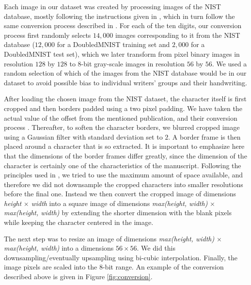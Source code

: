 \documentclass[eng]{simposium}
\begin{document}
Each image in our dataset was created by processing images of the NIST database,  
mostly following the instructions given in \cite{1}, which in turn follow the same conversion process described in \cite{8}.  
For each of the ten digits, our conversion process first randomly selects $14,000$ images corresponding to it from the NIST  
database ($12,000$ for a DoubledMNIST training set and $2,000$ for a DoubledMNIST test set), which we later transform  
from pixel binary images in resolution $128$ by $128$ to 8-bit gray-scale images in resolution $56$ by $56$.  
We used a random selection of which of the images from the NIST database would be in our dataset to avoid possible  
bias to individual writers' groups and their handwriting.  

After loading the chosen image from the NIST dataset, the character itself is first cropped and then borders padded using a two pixel padding.  
We have taken the actual value of the offset from the mentioned publication, and their conversion process \cite{1}.  
Thereafter, to soften the character borders, we blurred cropped image using a Gaussian filter with standard deviation set to $2$.  
A border frame is then placed around a character that is so extracted.  
It is important to emphasize here that the dimensions of the border frames differ greatly, since the dimension of the  
character is certainly one of the characteristics of the manuscript.  
Following the principles used in \cite{1}, we tried to use the maximum amount of space available, and  
therefore we did not downsample the cropped characters into smaller resolutions before the final one.  
Instead we then convert the cropped image of dimensions \textit{height} $\times$ \textit{width} into a square image of dimensions  
\textit{max(height, width)} $\times$ \textit{max(height, width)} by extending the shorter dimension with the blank pixels  
while keeping the character centered in the image.  

The next step was to resize an image of dimensions \textit{max(height, width)} $\times$ \textit{max(height, width)} into a  
dimensions $56 \times 56$. 
We did this downsampling/eventually upsampling using bi-cubic interpolation.  
Finally, the image pixels are scaled into the 8-bit range.  
An example of the conversion described above is given in Figure \ref{fig:conversion}.  
\end{document}
